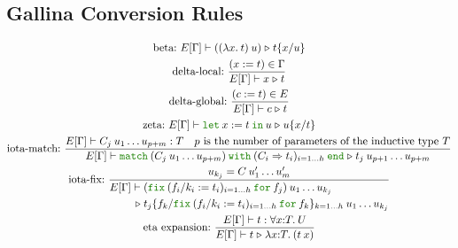 \documentclass[a4paper,fleqn]{article}
\def\gallina{\textrm{Gallina}}
\newcommand{\kwlet}{\mbox{\color{mygreen}\ttfamily let}}
\newcommand{\kwin}{\mbox{\color{mygreen}\ttfamily in}}
\newcommand{\kwmatch}{\mbox{\color{mygreen}\ttfamily match}}
\newcommand{\kwwith}{\mbox{\color{mygreen}\ttfamily with}}
\newcommand{\kwend}{\mbox{\color{mygreen}\ttfamily end}}
\newcommand{\kwfix}{\mbox{\color{mygreen}\ttfamily fix}}
\newcommand{\kwfor}{\mbox{\color{mygreen}\ttfamily for}}
\newcommand{\lam}[2]{\lambda #1.\:#2}
\newcommand{\lamT}[3]{\lambda #1\mathord{:}#2.\:#3}
\newcommand{\prodT}[3]{\forall #1\mathord{:}#2.\:#3}
\newcommand{\letin}[3]{\kwlet\:#1:=#2\:\kwin\:#3}
\newcommand{\match}[4]{\kwmatch\:#1\:\kwwith\:(#2 \Rightarrow #3)_{#4}\:\kwend}
\newcommand{\fix}[4]{\kwfix\:(#1 := #2)_{#3}\:\kwfor\:#4}
\newcommand{\WT}[4]{\ensuremath{#1[#2] \vdash #3 : #4}}
\newcommand{\WTE}[3]{\WT{E}{#1}{#2}{#3}}
\newcommand{\WTEG}[2]{\WTE{\Gamma}{#1}{#2}}
\newcommand{\subst}[3]{#1\{#2/#3\}}
\newcommand{\reltri}{\mathrel{\triangleright}}
\begin{document}

\subsection{\gallina{} Conversion Rules}\label{sec:conversion-rules}

\begin{gather*}
  \text{beta:}~
    E[\Gamma] \vdash ((\lam{x}{t})\:u) \reltri \subst{t}{x}{u} \\
  \text{delta-local:}~
    \dfrac{(x:=t) \in \Gamma}{E[\Gamma] \vdash x \reltri t} \\
  \text{delta-global:}~
    \dfrac{(c:=t) \in E}{E[\Gamma] \vdash c \reltri t} \\
  \text{zeta:}~
    E[\Gamma] \vdash \letin{x}{t}{u} \reltri \subst{u}{x}{t} \\
  \text{iota-match:}~
    \dfrac
    {
      E[\Gamma] \vdash C_j\:u_1\ldots u_{p+m} : T \quad
      \text{$p$ is the number of parameters of the inductive type $T$}
    }{
      E[\Gamma] \vdash
      \match{(C_j\:u_1\ldots u_{p+m})}{C_i}{t_i}{i=1\ldots h}
      \reltri
      t_j\:u_{p+1}\ldots u_{p+m}
    } \\
  \text{iota-fix:}~
    \dfrac{
      u_{k_j} = C\:u'_1\ldots u'_m
    }{
      \begin{aligned}
        E[\Gamma] \vdash\; &
          (\fix{f_i/k_i}{t_i}{i=1\ldots h}{f_j})\:u_1 \ldots u_{k_j} \\
        \reltri\; &
          \subst{t_j}{f_k}{\fix{f_i/k_i}{t_i}{i=1\ldots h}{f_k}}_{k=1\ldots h} \:u_1 \ldots u_{k_j}
      \end{aligned}
    } \\
  \text{eta expansion:}~
    \dfrac{\WTEG{t}{\prodT{x}{T}{U}}}{E[\Gamma] \vdash t \reltri \lamT{x}{T}{(t\:x)}}
\end{gather*}
\end{document}
